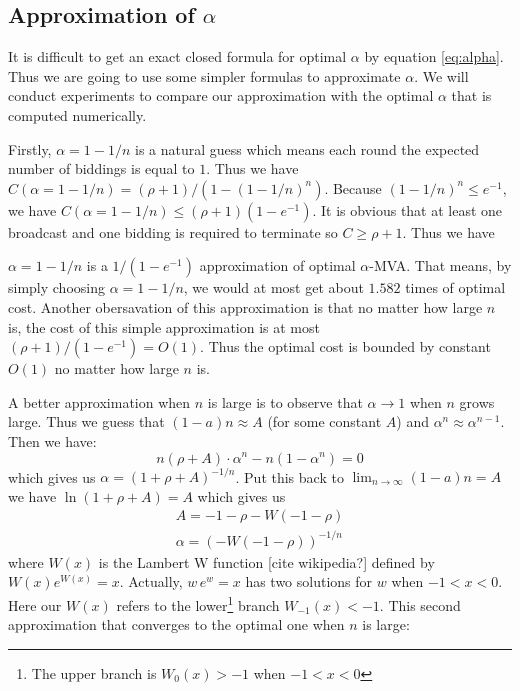 \subsection{Approximation of $\alpha$}

It is difficult to get an exact closed formula for optimal $\alpha$ by equation
\ref{eq:alpha}. Thus we are going to use some simpler formulas to approximate
$\alpha$. We will conduct experiments to compare our approximation with the
optimal $\alpha$ that is computed numerically. 

Firstly, $\alpha = 1-1/n$ is a natural guess which means each round the
expected number of biddings is equal to $1$. Thus we have $C(\alpha = 1-1/n) =
(\rho+1)/(1-(1-1/n)^n)$. Because $(1-1/n)^n \leq e^{-1}$, we have $C(\alpha =
1-1/n) \leq (\rho+1)(1-e^{-1})$.  It is obvious that at least one broadcast and
one bidding is required to terminate so $C \geq \rho+1$.  Thus we have

\begin{theorem}
$\alpha = 1-1/n$ is a $1/(1-e^{-1})$ approximation of optimal $\alpha$-MVA.
That means, by simply choosing $\alpha = 1-1/n$, we would at most get about
$1.582$ times of optimal cost. Another obersavation of this approximation is
that no matter how large $n$ is, the cost of this simple approximation is at
most $(\rho+1) / (1-e^{-1}) = O(1)$. Thus the optimal cost is bounded by
constant $O(1)$ no matter how large $n$ is.
\end{theorem}

A better approximation when $n$ is large is to observe that $\alpha \rightarrow
1$ when $n$ grows large.  Thus we guess 
that $(1-a)n \approx A$ (for some constant $A$) and $\alpha^n \approx
\alpha^{n-1}$. Then we have: 
$$ n (\rho+A) \cdot \alpha^n - n(1-\alpha^n) = 0 $$ 
which gives us $\alpha = (1+\rho+A)^{-1/n}$. Put this back to $\lim_{n
\rightarrow \infty} (1-a)n = A$ we have $\ln (1+\rho+A) = A$ which gives us
\begin{align}\label{eq:approx2}
A = -1-\rho-W(-1-\rho)\nonumber\\
\alpha = (-W(-1-\rho))^{-1/n} 
\end{align}
where $W(x)$ is the Lambert W function [cite wikipedia?] defined by $W(x)
e^{W(x)} = x$. Actually, $w\,e^w = x$ has two solutions for $w$ when $-1 < x <
0$. Here our $W(x)$ refers to the lower\footnote{The upper branch is
$W_0(x) > -1$ when $-1 < x < 0$} branch $W_{-1}(x) < -1$. This
second approximation that converges to the optimal one when $n$ is large:

